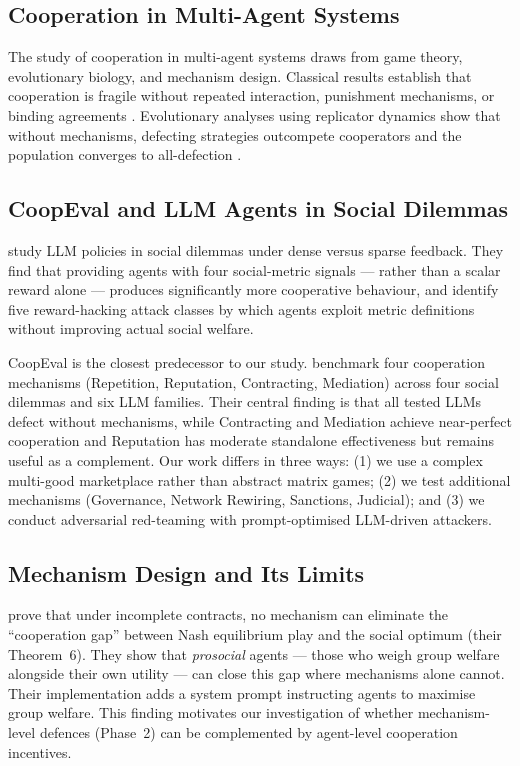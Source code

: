 \documentclass{article}
\begin{document}
\subsection{Cooperation in Multi-Agent Systems}

The study of cooperation in multi-agent systems draws from game theory, evolutionary biology, and mechanism design. Classical results establish that cooperation is fragile without repeated interaction, punishment mechanisms, or binding agreements \citep{axelrod1984}. Evolutionary analyses using replicator dynamics show that without mechanisms, defecting strategies outcompete cooperators and the population converges to all-defection \citep{coopeval}.

\subsection{CoopEval and LLM Agents in Social Dilemmas}

\citet{gallego2024} study LLM policies in social dilemmas under dense versus sparse feedback. They find that providing agents with four social-metric signals --- rather than a scalar reward alone --- produces significantly more cooperative behaviour, and identify five reward-hacking attack classes by which agents exploit metric definitions without improving actual social welfare.

CoopEval is the closest predecessor to our study. \citet{coopeval} benchmark four cooperation mechanisms (Repetition, Reputation, Contracting, Mediation) across four social dilemmas and six LLM families. Their central finding is that all tested LLMs defect without mechanisms, while Contracting and Mediation achieve near-perfect cooperation and Reputation has moderate standalone effectiveness but remains useful as a complement. Our work differs in three ways: (1) we use a complex multi-good marketplace rather than abstract matrix games; (2) we test additional mechanisms (Governance, Network Rewiring, Sanctions, Judicial); and (3) we conduct adversarial red-teaming with prompt-optimised LLM-driven attackers.

\subsection{Mechanism Design and Its Limits}

\citet{huang2025} prove that under incomplete contracts, no mechanism can eliminate the ``cooperation gap'' between Nash equilibrium play and the social optimum (their Theorem~6). They show that \textit{prosocial} agents --- those who weigh group welfare alongside their own utility --- can close this gap where mechanisms alone cannot. Their implementation adds a system prompt instructing agents to maximise group welfare. This finding motivates our investigation of whether mechanism-level defences (Phase~2) can be complemented by agent-level cooperation incentives.
\end{document}
